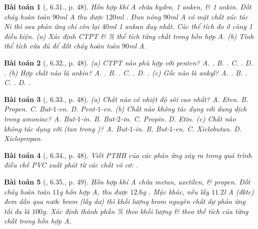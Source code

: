 \documentclass{article}
\newtheorem{baitoan}{Bài toán}
\begin{document}
\begin{baitoan}[\cite{SBT_Hoa_Hoc_11_co_ban}, 6.31., p. 48]
	Hỗn hợp khí A chứa hydro, 1 anken, \& 1 ankin. Đốt cháy hoàn toàn $90$\emph{ml} A thu được $120$\emph{ml} \emph{}. Đun nóng $90$\emph{ml} A có mặt chất xúc tác \emph{Ni} thì sau phản ứng chỉ còn lại $40$\emph{ml} 1 ankan duy nhất. Các thể tích đo ở cùng 1 điều kiện. (a) Xác định CTPT \& \% thể tích từng chất trong hỗn hợp A. (b) Tính thể tích \emph{} vừa đủ để đốt cháy hoàn toàn $90$\emph{ml} A.
\end{baitoan}

\begin{baitoan}[\cite{SBT_Hoa_Hoc_11_co_ban}, 6.32., p. 48]
	(a) CTPT nào phù hợp với penten? {\sf A.} \emph{}. {\sf B.} \emph{}. {\sf C.} \emph{}. {\sf D.} \emph{}. (b) Hợp chất nào là ankin? {\sf A.} \emph{}. {\sf B.} \emph{}. {\sf C.} \emph{}. {\sf D.} \emph{}. (c) Gốc nào là ankyl? {\sf A.} \emph{}. {\sf B.} \emph{}. {\sf C.} \emph{}. {\sf D.} \emph{}.
\end{baitoan}

\begin{baitoan}[\cite{SBT_Hoa_Hoc_11_co_ban}, 6.33., p. 48]
	(a) Chất nào có nhiệt độ sôi cao nhất? {\sf A.} Eten. {\sf B.} Propen. {\sf C.} But-$1$-en. {\sf D.} Pent-$1$-en. (b) Chất nào không tác dụng với dung dịch \emph{} trong amoniac? {\sf A.} But-$1$-in. {\sf B.} But-$2$-in. {\sf C.} Propin. {\sf D.} Etin. (c) Chất nào không tác dụng với \emph{} (tan trong \emph{})? {\sf A.} But-$1$-in. {\sf B.} But-$1$-en. {\sf C.} Xiclobutan. {\sf D.} Xiclopropan.
\end{baitoan}

\begin{baitoan}[\cite{SBT_Hoa_Hoc_11_co_ban}, 6.34., p. 48]
	Viết PTHH của các phản ứng xảy ra trong quá trình điều chế PVC xuất phát từ các chất vô cơ: \emph{}.
\end{baitoan}

\begin{baitoan}[\cite{SBT_Hoa_Hoc_11_co_ban}, 6.35., p. 49]
	Hỗn hợp khí A chứa metan, axetilen, \& propen. Đốt cháy hoàn toàn $11$\emph{g} hỗn hợp A, thu được $12.6$\emph{g }. Mặc khác, nếu lấy $11.2$\emph{l} A (đktc) đem dẫn qua nước brom (lấy dư) thì khối lượng brom nguyên chất dự phản ứng tối đa là $100$\emph{g}. Xác định thành phần \% theo khối lượng \& theo thế tích của từng chất trong hỗn hợp A.
\end{baitoan}
\end{document}
